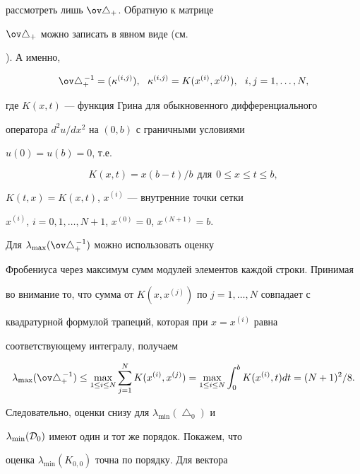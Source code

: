 \begin{pf}
рассмотреть лишь $\ov\bigtriangleup_+$. Обратную к матрице


$\ov\bigtriangleup_+$ можно записать в явном виде (см.


\cite{korneev1}). А именно,


$$


\ov\bigtriangleup^{\,-1}_+=(\kappa^{(i,j)}), \ \


\kappa^{(i,j)}=K(x^{(i)},x^{(j)}),\ \ i,j=1,\dotsc,N,


$$


где $K(x,t)$ --- функция Грина для обыкновенного дифференциального


оператора $d^2u/dx^2$ на $(0,b)$ с граничными условиями


$u(0)=u(b)=0$, т.е.


$$


K(x,t)=x(b-t)/b\ \ \text{для} \ \ 0\le x\le t\le b,


$$


$K(t,x)=K(x,t)$, $x^{(i)}$ --- внутренние точки сетки


$x^{(i)}$, $i=0,1,\dotsc,N+1$, $x^{(0)}=0$, $x^{(N+1)}=b$.





Для $\lambda_{\max}(\ov\bigtriangleup^{\,-1}_+)$ можно использовать оценку


Фробениуса через максимум сумм модулей элементов каждой строки. Принимая


во внимание то, что сумма от $K(x,x^{(j)})$ по $j=1,\dotsc,N$ совпадает с


квадратурной формулой трапеций, которая при $x=x^{(i)}$ равна


соответствующему интегралу, получаем


\begin{equation}\label{1.15}


\lambda_{\max}(\ov\bigtriangleup^{\,-1}_+)\le


\max_{1\le i\le N}\sum_{j=1}^N K(x^{(i)},x^{(j)})=


\max_{1\le i\le N}\int_0^b K(x^{(i)},t)dt=(N+1)^2/8.


\end{equation}


Следовательно, оценки снизу для $\lambda_{\min}(\bigtriangleup_0)$ и


$\lambda_{\min}({\cal D}_0)$ имеют один и тот же порядок. Покажем, что


оценка $\lambda_{\min}(K_{0,0})$ точна по порядку. Для вектора



\end{pf}
